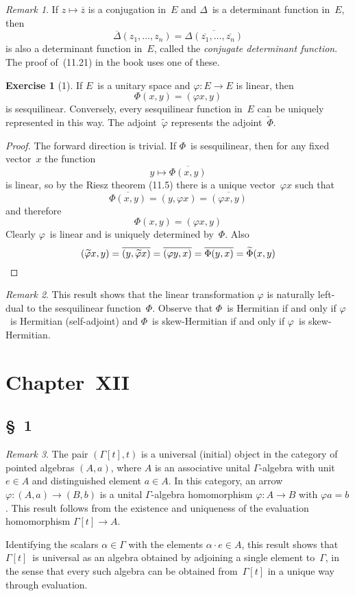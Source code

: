 \documentclass[letterpaper,12pt]{article}
\newcommand{\mult}{\cdot}
\newcommand{\iprod}[2]{(#1,#2)}
\newcommand{\adj}[1]{\widetilde{#1}}
\newcommand{\conj}[1]{\overline{#1}}
\theoremstyle{definition}
\newtheorem*{exer}{Exercise}
\theoremstyle{remark}
\newtheorem*{rmk}{Remark}
\begin{document}
\begin{rmk}
If \(z\mapsto\conj{z}\) is a conjugation in~\(E\) and \(\Delta\)~is a determinant function in~\(E\), then
\[\conj{\Delta}(z_1,\ldots,z_n)=\conj{\Delta(\conj{z_1},\ldots,\conj{z_n})}\]
is also a determinant function in~\(E\), called the \emph{conjugate determinant function}. The proof of~(11.21) in the book uses one of these.
\end{rmk}

\begin{exer}[1]
If \(E\)~is a unitary space and \(\varphi:E\to E\) is linear, then
\[\Phi(x,y)=\iprod{\varphi x}{y}\]
is sesquilinear. Conversely, every sesquilinear function in~\(E\) can be uniquely represented in this way. The adjoint~\(\adj{\varphi}\) represents the adjoint~\(\adj{\Phi}\).
\end{exer}
\begin{proof}
The forward direction is trivial. If \(\Phi\)~is sesquilinear, then for any fixed vector~\(x\) the function
\[y\mapsto\conj{\Phi(x,y)}\]
is linear, so by the Riesz theorem (11.5) there is a unique vector~\(\varphi x\) such that
\[\conj{\Phi(x,y)}=\iprod{y}{\varphi x}=\conj{\iprod{\varphi x}{y}}\]
and therefore
\[\Phi(x,y)=\iprod{\varphi x}{y}\]
Clearly \(\varphi\)~is linear and is uniquely determined by~\(\Phi\). Also
\[\iprod{\adj{\varphi}x}{y}=\conj{\iprod{y}{\adj{\varphi}x}}=\conj{\iprod{\varphi y}{x}}=\conj{\Phi(y,x)}=\adj{\Phi}(x,y)\qedhere\]
\end{proof}
\begin{rmk}
This result shows that the linear transformation \(\varphi\) is naturally left-dual to the sesquilinear function~\(\Phi\). Observe that \(\Phi\)~is Hermitian if and only if \(\varphi\)~is Hermitian (self-adjoint) and \(\Phi\)~is skew-Hermitian if and only if \(\varphi\)~is skew-Hermitian.
\end{rmk}

\section*{Chapter~XII}
\subsection*{\S~1}
\begin{rmk}
The pair \((\Gamma[t], t)\) is a universal (initial) object in the category of pointed algebras \((A,a)\), where \(A\) is an associative unital \(\Gamma\)-algebra with unit \(e\in A\) and distinguished element \(a\in A\). In this category, an arrow \(\varphi:(A,a)\to(B,b)\) is a unital \(\Gamma\)-algebra homomorphism \(\varphi:A\to B\) with \(\varphi a=b\). This result follows from the existence and uniqueness of the evaluation homomorphism \(\Gamma[t]\to A\).

Identifying the scalars \(\alpha\in\Gamma\) with the elements \(\alpha\mult e\in A\), this result shows that \(\Gamma[t]\)~is universal as an algebra obtained by adjoining a single element to~\(\Gamma\), in the sense that every such algebra can be obtained from~\(\Gamma[t]\) in a unique way through evaluation.
\end{rmk}
\end{document}
